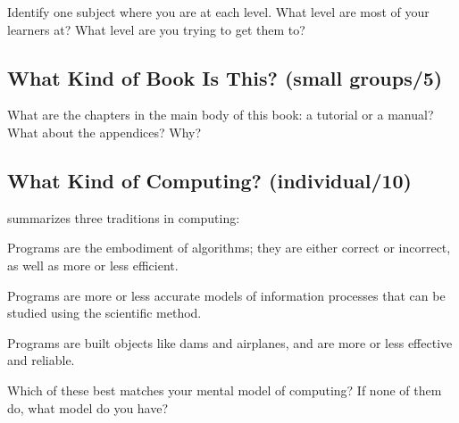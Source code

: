 Identify one subject where you are at each level. What level are most of
your learners at? What level are you trying to get them to?

\subsection{What Kind of Book Is This? (small groups/5)}\label{what-kind-of-book-is-this-small-groups5}

What are the chapters in the main body of this book: a tutorial or a
manual? What about the appendices? Why?

\subsection{What Kind of Computing? (individual/10)}\label{what-kind-of-computing-individual10}

\cite{Tedr2008} summarizes three traditions in computing:

\begin{description}
\tightlist
\item[Mathematical:]
Programs are the embodiment of algorithms; they are either correct
or incorrect, as well as more or less efficient.
\item[Scientific:]
Programs are more or less accurate models of information processes
that can be studied using the scientific method.
\item[Engineering:]
Programs are built objects like dams and airplanes, and are more or
less effective and reliable.
\end{description}

Which of these best matches your mental model of computing? If none of
them do, what model do you have?
